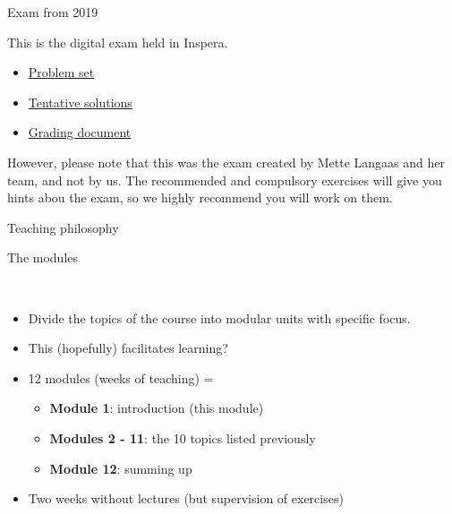 \documentclass[10pt,ignorenonframetext,]{beamer}
\providecommand{\tightlist}{%
  \setlength{\itemsep}{0pt}\setlength{\parskip}{0pt}}
\begin{document}
\begin{frame}{Exam from 2019}

This is the digital exam held in Inspera.

\begin{itemize}
\tightlist
\item
  \href{https://www.math.ntnu.no/emner/TMA4268/Exam/V2019e.pdf}{Problem
  set}
\item
  \href{https://www.math.ntnu.no/emner/TMA4268/Exam/e2019sol.html}{Tentative
  solutions}
\item
  \href{https://www.math.ntnu.no/emner/TMA4268/Exam/gradingdocumentV2019.pdf}{Grading
  document}
\end{itemize}

However, please note that this was the exam created by Mette Langaas and
her team, and not by us. The recommended and compulsory exercises will
give you hints abou the exam, so we highly recommend you will work on
them.

\end{frame}

\begin{frame}{Teaching philosophy}

\begin{block}{The modules}

~

\begin{itemize}
\item
  Divide the topics of the course into modular units with specific
  focus.
\item
  This (hopefully) facilitates learning?
\item
  12 modules (weeks of teaching) =

  \begin{itemize}
  \tightlist
  \item
    \textbf{Module 1}: introduction (this module)
  \item
    \textbf{Modules 2 - 11}: the 10 topics listed previously
  \item
    \textbf{Module 12}: summing up\\
    \hspace*{0.333em}
  \end{itemize}
\item
  Two weeks without lectures (but supervision of exercises)
\end{itemize}

\end{block}

\end{frame}
\end{document}
